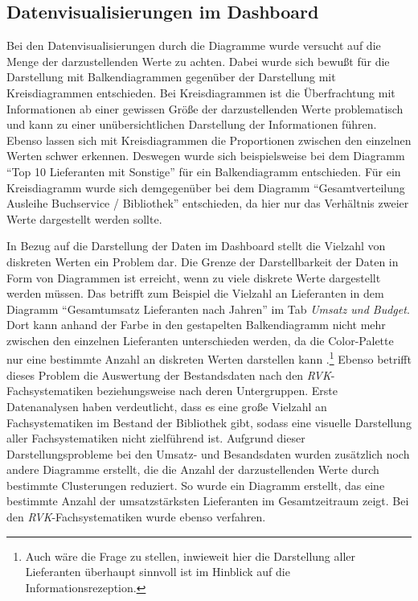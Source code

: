 \subsection{Datenvisualisierungen im Dashboard}
Bei den Datenvisualisierungen durch die Diagramme wurde versucht auf die Menge der darzustellenden Werte zu achten. Dabei wurde
sich bewußt für die Darstellung mit Balkendiagrammen gegenüber der Darstellung mit Kreisdiagrammen entschieden. Bei Kreisdiagrammen
ist die Überfrachtung mit Informationen ab einer gewissen Größe der darzustellenden Werte problematisch und kann zu einer unübersichtlichen
Darstellung der Informationen führen. Ebenso lassen sich mit Kreisdiagrammen die Proportionen zwischen den einzelnen Werten schwer erkennen.
Deswegen wurde sich beispielsweise bei dem Diagramm \enquote{Top 10 Lieferanten mit Sonstige} für ein Balkendiagramm entschieden. Für ein Kreisdiagramm
wurde sich demgegenüber bei dem Diagramm \enquote{Gesamtverteilung Ausleihe Buchservice / Bibliothek} entschieden, da hier nur das Verhältnis zweier Werte dargestellt werden sollte. 


In Bezug auf die Darstellung der Daten im Dashboard stellt die Vielzahl von diskreten Werten ein Problem dar. 
Die Grenze der Darstellbarkeit der Daten in Form von Diagrammen ist erreicht, wenn zu viele diskrete Werte dargestellt werden müssen.
Das betrifft zum Beispiel die Vielzahl an Lieferanten in dem Diagramm \enquote{Gesamtumsatz Lieferanten nach Jahren} im Tab \textit{Umsatz und Budget}. 
Dort kann anhand der Farbe in den gestapelten Balkendiagramm nicht mehr zwischen den einzelnen Lieferanten unterschieden werden, da die Color-Palette 
nur eine bestimmte Anzahl an diskreten Werten darstellen kann \cite[vgl.][]{plotly_discrete_2021}.\footnote{  Auch wäre die Frage zu stellen, inwieweit hier die Darstellung aller Lieferanten 
überhaupt sinnvoll ist im Hinblick auf die Informationsrezeption.}
Ebenso betrifft dieses Problem die Auswertung der Bestandsdaten nach den \textit{\acrshort{RVK}}-Fachsystematiken beziehungsweise nach deren Untergruppen. 
Erste Datenanalysen haben verdeutlicht, dass es eine große Vielzahl an Fachsystematiken im Bestand der Bibliothek gibt, sodass eine visuelle Darstellung aller Fachsystematiken nicht zielführend ist.
Aufgrund dieser Darstellungsprobleme bei den Umsatz- und Besandsdaten wurden zusätzlich noch andere Diagramme erstellt, die die Anzahl der darzustellenden Werte durch bestimmte Clusterungen reduziert.
So wurde ein Diagramm erstellt, das eine bestimmte Anzahl der umsatzstärksten Lieferanten im Gesamtzeitraum zeigt. Bei den \textit{\acrshort{RVK}}-Fachsystematiken wurde ebenso
verfahren.



